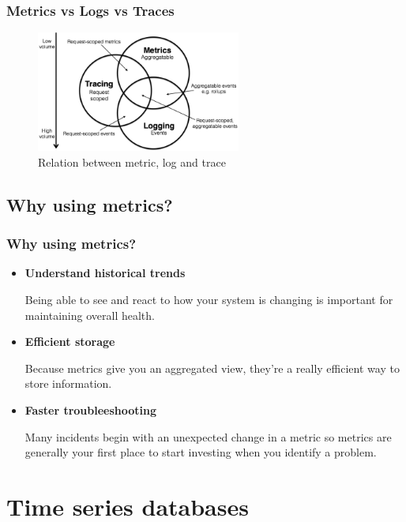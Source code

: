 \documentclass[compress]{beamer}
\begin{document}

\begin{frame}

\frametitle{Metrics vs Logs vs Traces}

\begin{figure}
\centering
\includegraphics[height=150px]{./images/01.png}
\caption{Relation between metric, log and trace}
\end{figure}

\end{frame}

\subsection{Why using metrics?}
\begin{frame}
\frametitle{Why using metrics?}
\begin{itemize}
\item \textbf{Understand historical trends}

Being able to see and react to how your system is changing is important for maintaining overall health.
\item \textbf{Efficient storage}

Because  metrics give you an aggregated view, they're a really efficient way to store information.

\item \textbf{Faster troubleeshooting}

Many incidents begin with an unexpected change in a metric so metrics are generally your first place to start investing when you identify a problem.
\end{itemize}
\end{frame}



\section{Time series databases}
\end{document}

